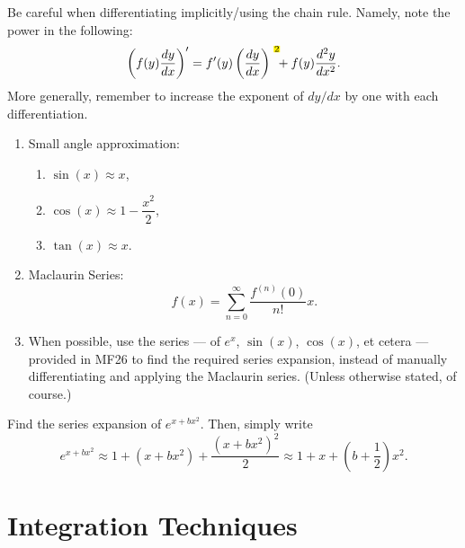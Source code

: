 \documentclass[oneside]{book}
\newcommand{\highlight}[2][red!50]{\mathpalette{\highlightwithstyle[#1]}{#2}}
\newcommand{\highlightwithstyle}[3][red!50]{
  \begingroup                         %
    \sbox0{$\mathsurround 0pt #2#3$}%
    \setlength{\fboxsep}{.5pt}        %
    \sbox2{\hspace{-.5pt}%
      \colorbox{#1}{\usebox0}%
    }%
    \dp2=\dp0 \ht2=\ht0 \wd2=\wd0     %
    \box2                             %
  \endgroup                           %
}
\begin{document}
\begin{note}
  Be careful when differentiating implicitly/using the chain rule. Namely, note the power  in the following:
  \[\left( f(y)\frac{dy}{dx} \right)'=f'(y)\left( \frac{dy}{dx} \right)^{\highlight[yellow]{2}}+f(y)\frac{d^2y}{dx^2}.\]
  More generally, remember to increase the exponent of \(dy/dx\) by one with each differentiation.
\end{note}
\begin{stbox}{}
  \begin{enumerate}
    \item Small angle approximation: 
    \begin{enumerate}
      \item \(\sin(x) \approx x\),
      \item \(\cos(x) \approx 1-\dfrac{x^2}{2}\),
      \item \(\tan(x) \approx x\).
    \end{enumerate}
    \item Maclaurin Series: 
    \[f(x)=\sum_{n=0}^{\infty}\dfrac{f^{(n)}(0)}{n!}x.\]
    \item When possible, use the series --- of \(e^{x}\), \(\sin(x)\), \(\cos(x)\), et cetera --- provided in MF26 to find the required series expansion, instead of manually differentiating and applying the Maclaurin series. (Unless otherwise stated, of course.)  
  \end{enumerate}
  \begin{example*}{}{}
    Find the series expansion of \(e^{x+bx^2}\). Then, simply write
    \[e^{x+bx^2}\approx 1+(x+bx^2)+\frac{(x+bx^2)^2}{2}\approx 1+x+\left( b+\frac{1}{2} \right)x^2.\]
  \end{example*}
\end{stbox}
\chapter{Integration Techniques}
\end{document}

